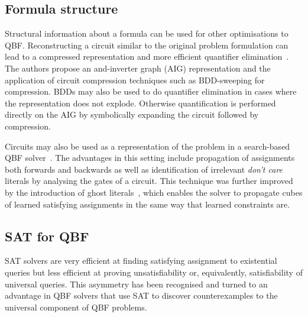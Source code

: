 \subsection{Formula structure}

Structural information about a formula can be used for other optimisations to QBF. Reconstructing a circuit similar to the original problem formulation can lead to a compressed representation and more efficient quantifier elimination~\cite{Pigorsch10, Pigorsch09}. The authors propose an and-inverter graph (AIG) representation and the application of circuit compression techniques such as BDD-sweeping for compression. BDDs may also be used to do quantifier elimination in cases where the representation does not explode. Otherwise quantification is performed directly on the AIG by symbolically expanding the circuit followed by compression.

Circuits may also be used as a representation of the problem in a search-based QBF solver~\cite{Goultiaeva09}. The advantages in this setting include propagation of assignments both forwards and backwards as well as identification of irrelevant \emph{don't care} literals by analysing the gates of a circuit. This technique was further improved by the introduction of ghost literals~\cite{Klieber10}, which enables the solver to propagate cubes of learned satisfying assignments in the same way that learned constraints are.

\subsection{SAT for QBF}

SAT solvers are very efficient at finding satisfying assignment to existential queries but less efficient at proving unsatisfiability or, equivalently, satisfiability of universal queries. This asymmetry has been recognised and turned to an advantage in QBF solvers that use SAT to discover counterexamples to the universal component of QBF problems.

